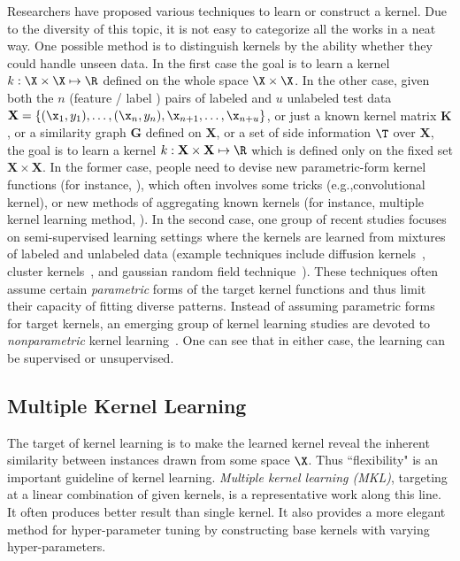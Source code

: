 Researchers have proposed various techniques to learn or construct a kernel. Due to the diversity of this topic, it is not easy to categorize all the works in a neat way. One possible method is to distinguish kernels by the ability whether they could handle unseen data. In the first case the goal is to learn a kernel $k: \X\times\X\mapsto\R$ defined on the whole space $\X\times\X$. In the other case, given both the $n$ (feature / label ) pairs of labeled and $u$ unlabeled test data $\mathbf X=\{(\x_1,y_1),\dots,(\x_n,y_n),\x_{n+1},\ldots,\x_{n+u}\}$, or just a known kernel matrix $\mathbf K$, or a similarity graph $\mathbf G$ defined on $\mathbf X$, or a set of side information $\T$ over $\mathbf X$, the goal is to learn a kernel $k:\mathbf X\times\mathbf X\mapsto\R$ which is defined only on the fixed set $\mathbf X\times\mathbf X$. In the former case, people need to devise new parametric-form kernel functions (for instance, \cite{icml/GartnerFKS02,jmlr/LodhiSSCW02,kdd/Gartner03,colt/CortesKM07,jmlr/GraumanD07,icml/SahbiARK08}), which often involves some tricks (e.g.,convolutional kernel\cite{tr/Haussler99,icml/ShinK08}), or new methods of aggregating known kernels (for instance, multiple kernel learning method, \cite{icml/BachLJ04,jmlr/LanckrietCBGJ03,jmlr/SonnenburgRSS06,jmlr/RakotomamonjyBCG08,nips/XuJKL08}). In the second case, one group of recent studies focuses on semi-supervised learning settings where the kernels are learned from mixtures of labeled and unlabeled data (example techniques include diffusion kernels~\cite{icml/KondorL02}, cluster kernels~\cite{nips/ChapelleWS02}, and  gaussian random field
technique~\cite{icml/ZhuGL03}). These techniques often assume certain {\it parametric} forms of the target kernel functions and thus limit their capacity of fitting diverse patterns. Instead of assuming parametric forms for target kernels, an emerging
group of kernel learning studies are devoted to {\em nonparametric} kernel
learning~\cite{nips/CristianiniSEK01,jmlr/LanckrietCBGJ03,nips/ZhuKGL04,icml/KulisSD06,icml/HoiJL07,icml/HoiJ08}. One can see that in either case, the learning can be supervised or unsupervised.

\subsection{Multiple Kernel Learning}

The target of kernel learning is to make the learned kernel reveal the inherent similarity between instances drawn from some space $\X$. Thus ``flexibility" is an important guideline of kernel learning. {\em Multiple kernel learning (MKL)}\cite{jmlr/LanckrietCBGJ03}, targeting at a linear combination of given kernels, is a representative work along this line. It often produces better result than single kernel. It also provides a more elegant method for hyper-parameter tuning by constructing base kernels with varying hyper-parameters.

